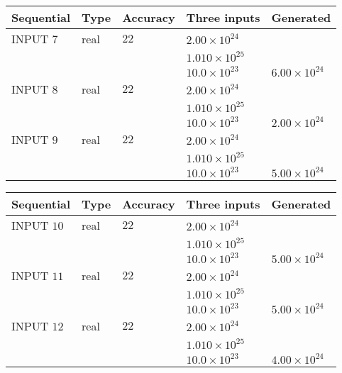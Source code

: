 \documentclass[12pt]{article}
\begin{document}
   
  
  
\noindent\begin{tabular}{|l|l|l|l|l|}
\hline
 Sequential & Type & Accuracy & Three inputs & Generated \\ 
\hline
 
 
  INPUT $           7$ & real & $          22 $ & $
 2.00 \times 10^{24}
  $ & \\
  & & &  $
 1.010 \times 10^{25}
  $ & \\
  & & &  $
 10.0 \times 10^{23}
 $ & $ 6.00 \times 10^{24} $ 
 \\  \hline  
 
 
  INPUT $           8$ & real & $          22 $ & $
 2.00 \times 10^{24}
  $ & \\
  & & &  $
 1.010 \times 10^{25}
  $ & \\
  & & &  $
 10.0 \times 10^{23}
 $ & $ 2.00 \times 10^{24} $ 
 \\  \hline  
 
 
  INPUT $           9$ & real & $          22 $ & $
 2.00 \times 10^{24}
  $ & \\
  & & &  $
 1.010 \times 10^{25}
  $ & \\
  & & &  $
 10.0 \times 10^{23}
 $ & $ 5.00 \times 10^{24} $ 
 \\  \hline  
 \end{tabular}
   
   
  
  
\noindent\begin{tabular}{|l|l|l|l|l|}
\hline
 Sequential & Type & Accuracy & Three inputs & Generated \\ 
\hline
 
 
  INPUT $          10$ & real & $          22 $ & $
 2.00 \times 10^{24}
  $ & \\
  & & &  $
 1.010 \times 10^{25}
  $ & \\
  & & &  $
 10.0 \times 10^{23}
 $ & $ 5.00 \times 10^{24} $ 
 \\  \hline  
 
 
  INPUT $          11$ & real & $          22 $ & $
 2.00 \times 10^{24}
  $ & \\
  & & &  $
 1.010 \times 10^{25}
  $ & \\
  & & &  $
 10.0 \times 10^{23}
 $ & $ 5.00 \times 10^{24} $ 
 \\  \hline  
 
 
  INPUT $          12$ & real & $          22 $ & $
 2.00 \times 10^{24}
  $ & \\
  & & &  $
 1.010 \times 10^{25}
  $ & \\
  & & &  $
 10.0 \times 10^{23}
 $ & $ 4.00 \times 10^{24} $ 
 \\  \hline  
 \end{tabular}
   
\end{document}
